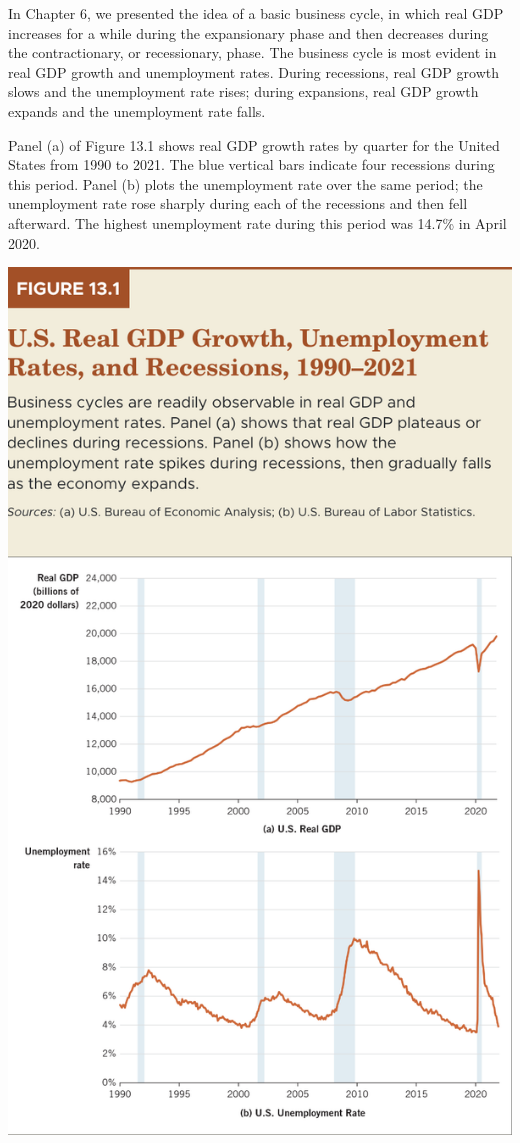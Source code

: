 \documentclass[11pt]{article} %
\begin{document}
In Chapter 6, we presented the idea of a basic business cycle, in which real GDP increases for a while during the expansionary phase and then decreases during the contractionary, or recessionary, phase. The business cycle is most evident in real GDP growth and unemployment rates. During recessions, real GDP growth slows and the unemployment rate rises; during expansions, real GDP growth expands and the unemployment rate falls.

Panel (a) of Figure 13.1 shows real GDP growth rates by quarter for the United States from 1990 to 2021. The blue vertical bars indicate four recessions during this period. Panel (b) plots the unemployment rate over the same period; the unemployment rate rose sharply during each of the recessions and then fell afterward. The highest unemployment rate during this period was 14.7\% in April 2020.

\begin{center}
\includegraphics[scale=0.4]{images/Figure 13.1.png}
\end{center} 
\end{document}
